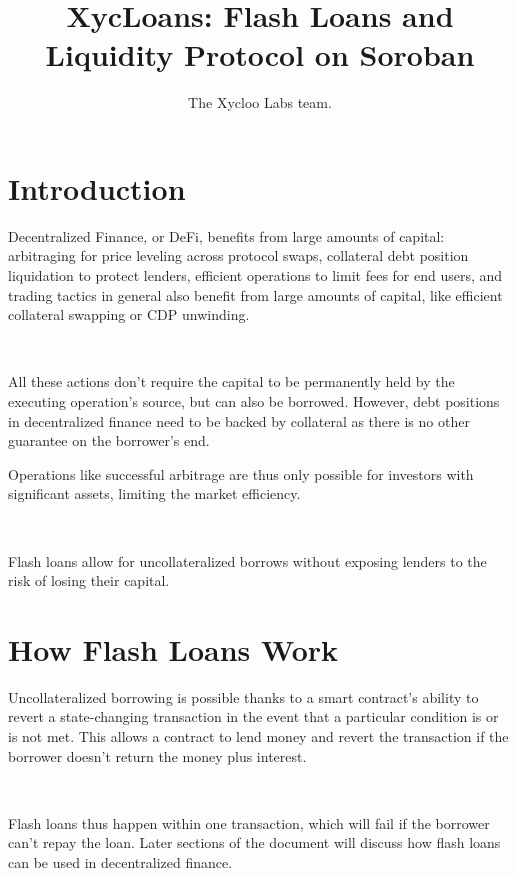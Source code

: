 \documentclass[twocolumn]{article}
\title{XycLoans: Flash Loans and \\ Liquidity Protocol on Soroban}
\author{
    The Xycloo Labs team.
    \vspace{1.5cm}
}
\date{}
\begin{document}
\maketitle




\vspace{30px}

\section{Introduction}
Decentralized Finance, or DeFi, benefits from large amounts of capital: arbitraging for price leveling across protocol swaps, collateral debt position liquidation to protect lenders, efficient operations to limit fees for end users, and trading tactics in general also benefit from large amounts of capital, like efficient collateral swapping or CDP unwinding.

\

All these actions don't require the capital to be permanently held by the executing operation's source, but can also be borrowed. However, debt positions in decentralized finance need to be backed by collateral as there is no other guarantee on the borrower's end. 

Operations like successful arbitrage are thus only possible for investors with significant assets, limiting the market efficiency.

\

Flash loans allow for uncollateralized borrows without exposing lenders to the risk of losing their capital.

\vspace{20px}

\section{How Flash Loans Work}
Uncollateralized borrowing is possible thanks to a smart contract's ability to revert a state-changing transaction in the event that a particular condition is or is not met. This allows a contract to lend money and revert the transaction if the borrower doesn't return the money plus interest.

\

Flash loans thus happen within one transaction, which will fail if the borrower can't repay the loan. Later sections of the document will discuss how flash loans can be used in decentralized finance.
\end{document}
